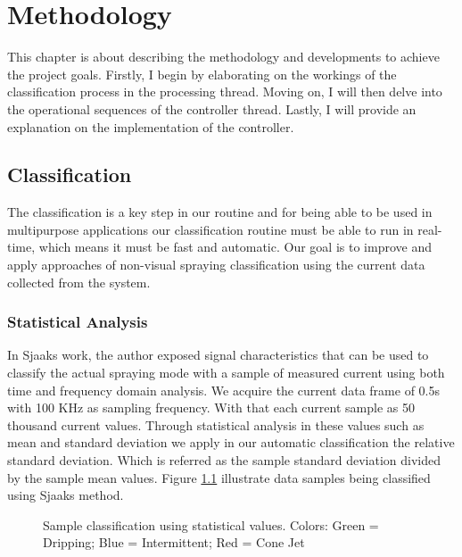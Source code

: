 \chapter{Methodology}
\label{chap:Methodology}

This chapter is about describing the methodology and developments to achieve the project goals. 
Firstly, I begin by elaborating on the workings of the classification process in the processing thread. Moving on, I will then delve into the operational sequences of the controller thread. Lastly, I will provide an explanation on the implementation of the controller.


\section{Classification}
\label{sec:section_classification}

The classification is a key step in our routine and for being able to be used in multipurpose applications our classification routine must be able to run in real-time, which means it must be fast and automatic.
Our goal is to improve and apply approaches of non-visual spraying classification using the current data collected from the system.

\subsection{Statistical Analysis}
In Sjaaks\cite{Sjaaks} work, the author exposed signal characteristics that can be used to classify the actual spraying mode with a sample of measured current using both time and frequency domain analysis.
We acquire the current data frame of 0.5s with 100 KHz as sampling frequency. With that each current sample as 50 thousand current values. Through statistical analysis in these values such as mean and standard deviation we apply in our automatic classification the relative standard deviation. Which is referred as the sample standard deviation divided by the sample mean values. 
Figure \ref{fig:sjaaks_statistical_class} illustrate data samples being classified using Sjaaks method.

\begin{figure}[H]
    \centering
    \caption{Sample classification using statistical values. Colors: Green = Dripping; Blue = Intermittent; Red = Cone Jet}
    \label{fig:sjaaks_statistical_class}
\end{figure}

